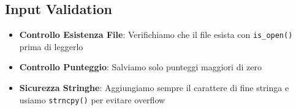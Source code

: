 \documentclass[a4paper,12pt]{article}
\begin{document}
\subsection{Input Validation}

\begin{itemize}
    \item \textbf{Controllo Esistenza File}: Verifichiamo che il file esista con \texttt{is\_open()} prima di leggerlo
    \item \textbf{Controllo Punteggio}: Salviamo solo punteggi maggiori di zero
    \item \textbf{Sicurezza Stringhe}: Aggiungiamo sempre il carattere di fine stringa e usiamo \texttt{strncpy()} per evitare overflow
\end{itemize}
\end{document}
